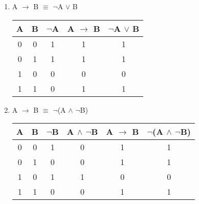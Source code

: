 \documentclass{report}
\begin{document}
\begin{enumerate}



  \item A $\to$ B $\equiv$ $\neg$A $\lor$ B



\begin{center}

  \begin{tabular}{| c | c | c | c | c |}

    \hline

    A & B & $\neg$A & A $\to$ B & $\neg$A $\lor$ B \\ \hline

    0 & 0 & 1 & 1 & 1 \\

    0 & 1 & 1 & 1 & 1 \\ 

    1 & 0 & 0 & 0 & 0 \\

    1 & 1 & 0 & 1 & 1 \\ \hline

  \end{tabular}

\end{center}



  \item A $\to$ B $\equiv$ $\neg$(A $\land$ $\neg$B)



\begin{center}

  \begin{tabular}{| c | c | c | c | c | c |}

    \hline

    A & B & $\neg$B & A $\land$ $\neg$B & A $\to$ B & $\neg$(A $\land$ $\neg$B) \\ \hline

    0 & 0 & 1 & 0 & 1 & 1 \\

    0 & 1 & 0 & 0 & 1 & 1 \\

    1 & 0 & 1 & 1 & 0 & 0 \\

    1 & 1 & 0 & 0 & 1 & 1 \\ \hline

  \end{tabular}

\end{center}




\end{enumerate}
\end{document}
